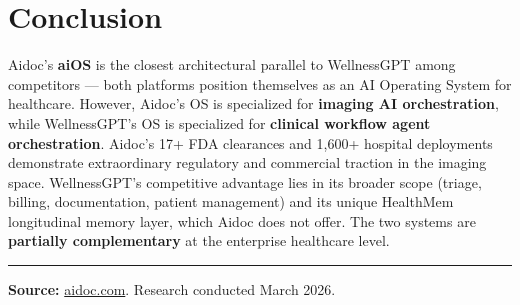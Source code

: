 \documentclass[12pt,a4paper]{article}
\begin{document}
\section{Conclusion}

Aidoc's \textbf{aiOS\texttrademark} is the closest architectural parallel to WellnessGPT among competitors --- both platforms position themselves as an AI Operating System for healthcare. However, Aidoc's OS is specialized for \textbf{imaging AI orchestration}, while WellnessGPT's OS is specialized for \textbf{clinical workflow agent orchestration}. Aidoc's 17+ FDA clearances and 1,600+ hospital deployments demonstrate extraordinary regulatory and commercial traction in the imaging space. WellnessGPT's competitive advantage lies in its broader scope (triage, billing, documentation, patient management) and its unique HealthMem longitudinal memory layer, which Aidoc does not offer. The two systems are \textbf{partially complementary} at the enterprise healthcare level.

\vspace{0.5cm}\hrule\vspace{0.3cm}
\small\textbf{Source:} \href{https://aidoc.com}{aidoc.com}. Research conducted March 2026.
\end{document}
